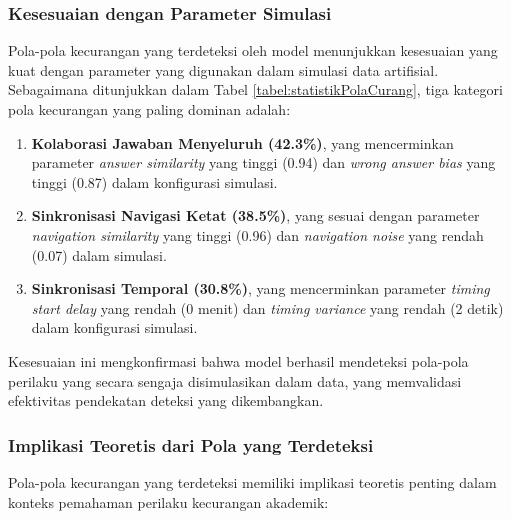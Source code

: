 \subsubsection{Kesesuaian dengan Parameter Simulasi}

Pola-pola kecurangan yang terdeteksi oleh model menunjukkan kesesuaian yang kuat dengan parameter yang digunakan dalam simulasi data artifisial. Sebagaimana ditunjukkan dalam Tabel \ref{tabel:statistikPolaCurang}, tiga kategori pola kecurangan yang paling dominan adalah:

\begin{enumerate}
    \item \textbf{Kolaborasi Jawaban Menyeluruh (42.3\%)}, yang mencerminkan parameter \textit{answer similarity} yang tinggi (0.94) dan \textit{wrong answer bias} yang tinggi (0.87) dalam konfigurasi simulasi.
    
    \item \textbf{Sinkronisasi Navigasi Ketat (38.5\%)}, yang sesuai dengan parameter \textit{navigation similarity} yang tinggi (0.96) dan \textit{navigation noise} yang rendah (0.07) dalam simulasi.
    
    \item \textbf{Sinkronisasi Temporal (30.8\%)}, yang mencerminkan parameter \textit{timing start delay} yang rendah (0 menit) dan \textit{timing variance} yang rendah (2 detik) dalam konfigurasi simulasi.
\end{enumerate}

Kesesuaian ini mengkonfirmasi bahwa model berhasil mendeteksi pola-pola perilaku yang secara sengaja disimulasikan dalam data, yang memvalidasi efektivitas pendekatan deteksi yang dikembangkan.

\subsubsection{Implikasi Teoretis dari Pola yang Terdeteksi}

Pola-pola kecurangan yang terdeteksi memiliki implikasi teoretis penting dalam konteks pemahaman perilaku kecurangan akademik:

